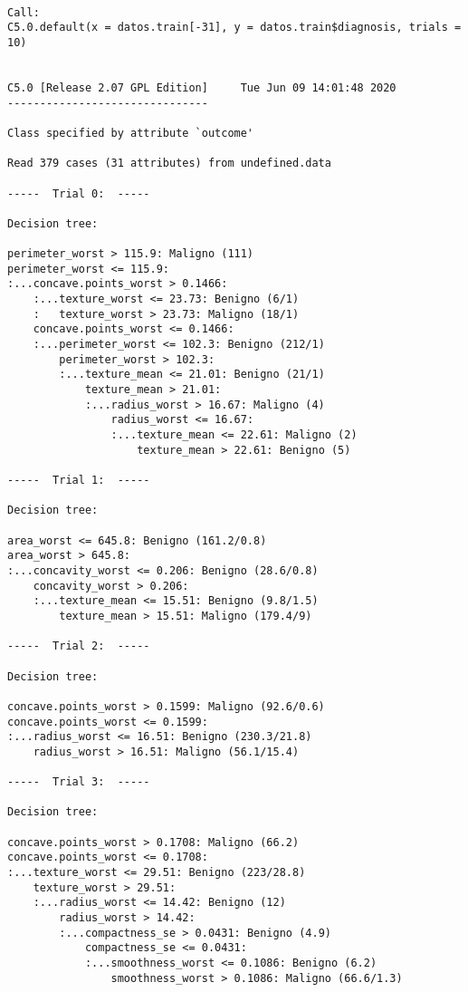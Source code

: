 \documentclass[
]{article}
\begin{document}
\begin{verbatim}

Call:
C5.0.default(x = datos.train[-31], y = datos.train$diagnosis, trials = 10)


C5.0 [Release 2.07 GPL Edition]     Tue Jun 09 14:01:48 2020
-------------------------------

Class specified by attribute `outcome'

Read 379 cases (31 attributes) from undefined.data

-----  Trial 0:  -----

Decision tree:

perimeter_worst > 115.9: Maligno (111)
perimeter_worst <= 115.9:
:...concave.points_worst > 0.1466:
    :...texture_worst <= 23.73: Benigno (6/1)
    :   texture_worst > 23.73: Maligno (18/1)
    concave.points_worst <= 0.1466:
    :...perimeter_worst <= 102.3: Benigno (212/1)
        perimeter_worst > 102.3:
        :...texture_mean <= 21.01: Benigno (21/1)
            texture_mean > 21.01:
            :...radius_worst > 16.67: Maligno (4)
                radius_worst <= 16.67:
                :...texture_mean <= 22.61: Maligno (2)
                    texture_mean > 22.61: Benigno (5)

-----  Trial 1:  -----

Decision tree:

area_worst <= 645.8: Benigno (161.2/0.8)
area_worst > 645.8:
:...concavity_worst <= 0.206: Benigno (28.6/0.8)
    concavity_worst > 0.206:
    :...texture_mean <= 15.51: Benigno (9.8/1.5)
        texture_mean > 15.51: Maligno (179.4/9)

-----  Trial 2:  -----

Decision tree:

concave.points_worst > 0.1599: Maligno (92.6/0.6)
concave.points_worst <= 0.1599:
:...radius_worst <= 16.51: Benigno (230.3/21.8)
    radius_worst > 16.51: Maligno (56.1/15.4)

-----  Trial 3:  -----

Decision tree:

concave.points_worst > 0.1708: Maligno (66.2)
concave.points_worst <= 0.1708:
:...texture_worst <= 29.51: Benigno (223/28.8)
    texture_worst > 29.51:
    :...radius_worst <= 14.42: Benigno (12)
        radius_worst > 14.42:
        :...compactness_se > 0.0431: Benigno (4.9)
            compactness_se <= 0.0431:
            :...smoothness_worst <= 0.1086: Benigno (6.2)
                smoothness_worst > 0.1086: Maligno (66.6/1.3)


\end{verbatim}
\end{document}
